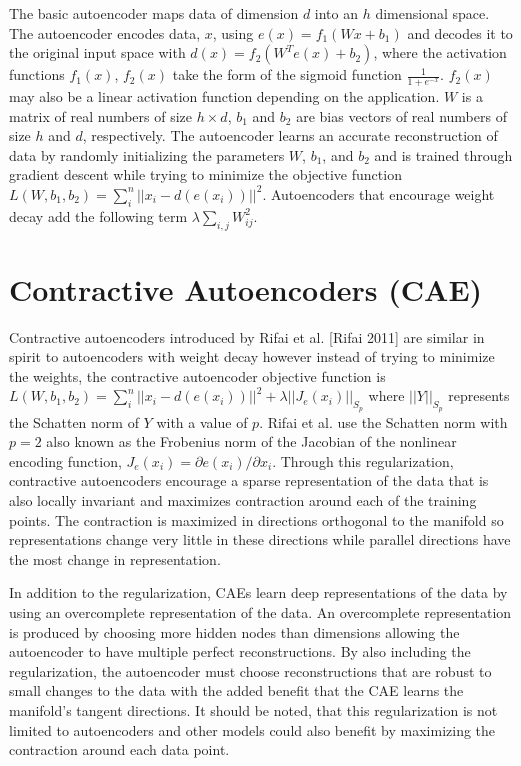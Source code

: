 \documentclass{article} %
\begin{document}
The basic autoencoder maps data of dimension $d$ into an $h$ dimensional space. The autoencoder encodes data, $x$, using $e(x) = f_1(Wx + b_1) $ and decodes it to the original input space with $d(x) = f_2(W^{T} e(x) + b_2)$, where the activation functions $f_1(x)$, $f_2(x)$ take the form of the sigmoid function $\frac{1}{1 + e^{-x}}$. $f_2(x)$ may also be a linear activation function depending on the application. $W$ is a matrix of real numbers of size $h \times d$, $b_1$ and $b_2$ are bias vectors of real numbers of size $h$ and $d$, respectively. The autoencoder learns an accurate reconstruction of data by randomly initializing the parameters $W$, $b_1$, and $b_2$ and is trained through gradient descent while trying to minimize the objective function $L(W, b_1, b_2) = \sum^n_i{ || x_i - d(e(x_i)) ||^2 }$. Autoencoders that encourage weight decay add the following term $\lambda \sum_{i,j}{W_{ij}^2}$. 

\section{Contractive Autoencoders (CAE)}

Contractive autoencoders introduced by Rifai et al. [Rifai 2011] are similar in spirit to autoencoders with weight decay however instead of trying to minimize the weights, the contractive autoencoder objective function is $L(W, b_1, b_2) = \sum^n_i{ || x_i - d(e(x_i)) ||^2 } + \lambda || J_e (x_i) ||_{S_p} $ where $|| Y ||_{S_p}$ represents the Schatten norm of $Y$ with a value of $p$. Rifai et al. use the Schatten norm with $p=2$ also known as the Frobenius norm of the Jacobian of the nonlinear encoding function, $ J_{e}(x_i) = \partial e(x_i) / \partial x_i$. Through this regularization, contractive autoencoders encourage a sparse representation of the data that is also locally invariant and maximizes contraction around each of the training points. The contraction is maximized in directions orthogonal to the manifold so representations change very little in these directions while parallel directions have the most change in representation. 

In addition to the regularization, CAEs learn deep representations of the data by using an overcomplete representation of the data. An overcomplete representation is produced by choosing more hidden nodes than dimensions allowing the autoencoder to have multiple perfect reconstructions. By also including the regularization, the autoencoder must choose reconstructions that are robust to small changes to the data with the added benefit that the CAE learns the manifold's tangent directions. It should be noted, that this regularization is not limited to autoencoders and other models could also benefit by maximizing the contraction around each data point.
\end{document}
